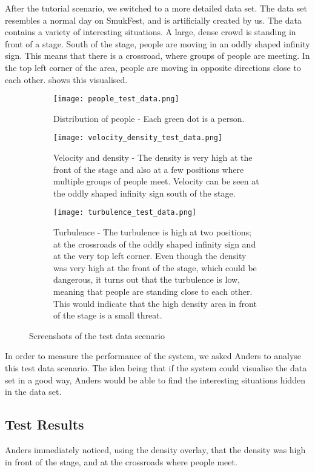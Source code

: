 After the tutorial scenario, we switched to a more detailed data set. The data set resembles a normal day on SmukFest, and is artificially created by us. The data contains a variety of interesting situations. A large, dense crowd is standing in front of a stage. South of the stage, people are moving in an oddly shaped infinity sign. This means that there is a crossroad, where groups of people are meeting. In the top left corner of the area, people are moving in opposite directions close to each other.  shows this visualised. 

\begin{figure}[htbp]
\begin{subfigure}[t]{.49\linewidth}
    \centering
    \texttt{[image: people\_test\_data.png]}
    \caption{Distribution of people - Each green dot is a person.}
\end{subfigure}
\enspace
\begin{subfigure}[t]{.49\linewidth}
    \centering
    \texttt{[image: velocity\_density\_test\_data.png]}
    \caption{Velocity and density - The density is very high at the front of the stage and also at a few positions where multiple groups of people meet. Velocity can be seen at the oddly shaped infinity sign south of the stage.}
\end{subfigure}
\enspace
\begin{subfigure}[t]{.49\linewidth}
    \centering
    \texttt{[image: turbulence\_test\_data.png]}
    \caption{Turbulence - The turbulence is high at two positions; at the crossroads of the oddly shaped infinity sign and at the very top left corner. Even though the density was very high at the front of the stage, which could be dangerous, it turns out that the turbulence is low, meaning that people are standing close to each other. This would indicate that the high density area in front of the stage is a small threat.}
\end{subfigure}
\caption{Screenshots of the test data scenario}
\label{fig:test_data_screens}
\end{figure}

In order to measure the performance of the system, we asked Anders to analyse this test data scenario. The idea being that if the system could visualise the data set in a good way, Anders would be able to find the interesting situations hidden in the data set.

\subsection{Test Results}
Anders immediately noticed, using the density overlay, that the density was high in front of the stage, and at the crossroads where people meet. 

